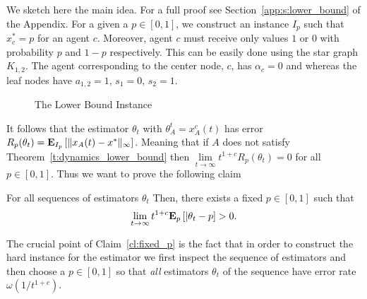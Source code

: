 We sketch here the main idea. For a full proof see Section~\ref{app:s:lower_bound}
of the Appendix.  For a given a $p \in [0,1]$, we construct an instance $I_p$ such that
$x_c^*=p$ for an agent $c$. Moreover, agent $c$ must
receive only values $1$ or $0$ with probability $p$ and $1-p$ respectively.
This can be easily done using the star graph $K_{1,2}$.
The agent corresponding to the center node, $c$, has $\alpha_c = 0$ and
whereas the leaf nodes have $a_{1,2} = 1$, $s_1 = 0$, $s_2 = 1$.
%
\begin{figure}
  \centering

  \caption{The Lower Bound Instance} \label{fig:lb_instance}
\end{figure}
%
It follows that the estimator $\theta_t$ with $\theta_A^t = x_A^c(t)$
has error $R_p(\theta_t)=\bm{\mathrm{E}}_{I_p} \left[ \| x_A(t)-x^* \|_{\infty} \right]$.
Meaning that if $A$ does not satisfy Theorem~\ref{t:dynamics_lower_bound}
then $\lim\limits_{t \rightarrow \infty}t^{1+c}R_p(\theta_t)=0$ for all
$p \in [0,1]$. Thus we want to prove the following claim
\begin{claim}\label{cl:fixed_p}
  For all sequences of estimators $\theta_t$
  Then, there exists a fixed $p \in [0,1]$ such that
  \[
    \lim_{t \to \infty} t^{1+c} \bm{\mathrm{E}}_{p} \left[ |\theta_t - p \right] > 0.
  \]
\end{claim}
The crucial point of Claim~\ref{cl:fixed_p} is the fact that
in order to construct the hard instance for the estimator
we first inspect the sequence of estimators and then choose
a $p \in [0,1]$ so that \emph{all} estimators $\theta_t$ of
the sequence have error rate $\omega(1/t^{1+c})$.

